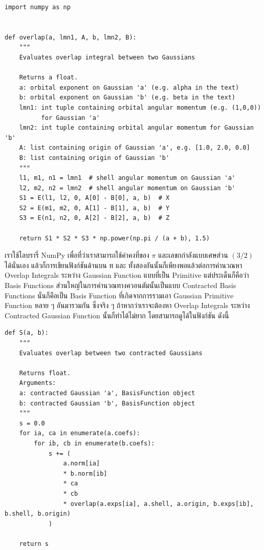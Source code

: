 \vspace{5pt}

\begin{lstlisting}[style=MyPython]
import numpy as np


def overlap(a, lmn1, A, b, lmn2, B):
    """
    Evaluates overlap integral between two Gaussians

    Returns a float.
    a: orbital exponent on Gaussian 'a' (e.g. alpha in the text)
    b: orbital exponent on Gaussian 'b' (e.g. beta in the text)
    lmn1: int tuple containing orbital angular momentum (e.g. (1,0,0))
          for Gaussian 'a'
    lmn2: int tuple containing orbital angular momentum for Gaussian 'b'
    A: list containing origin of Gaussian 'a', e.g. [1.0, 2.0, 0.0]
    B: list containing origin of Gaussian 'b'
    """
    l1, m1, n1 = lmn1  # shell angular momentum on Gaussian 'a'
    l2, m2, n2 = lmn2  # shell angular momentum on Gaussian 'b'
    S1 = E(l1, l2, 0, A[0] - B[0], a, b)  # X
    S2 = E(m1, m2, 0, A[1] - B[1], a, b)  # Y
    S3 = E(n1, n2, 0, A[2] - B[2], a, b)  # Z

    return S1 * S2 * S3 * np.power(np.pi / (a + b), 1.5)
\end{lstlisting}

\vspace{5pt}

เราใช้ไลบรารี่ NumPy เพื่อที่ว่าเราสามารถใช้ค่าคงที่ของ $\pi$ และเลขกกำลังแบบเศษส่วน $(3/2)$ ได้นั่นเอง แล้วก็การเขียนฟังก์ชันด้านบน
ท และ  ทั้งสองอันนั้นก็เพียงพอแล้วต่อการคำนวณหา Overlap Integrals ระหว่าง Gaussian Function
แบบที่เป็น Primitive แต่ประเด็นก็คือว่า Basis Functions ส่วนใหญ่ในการคำนวณทางควอนตัมนั้นเป็นแบบ Contracted Basis Functions
นั่นก็คือเป็น Basis Function ที่เกิดจากการรวมเอา Gaussian Primitive Function หลาย ๆ อันมารวมกัน ซึ่งจริง ๆ ถ้าหากว่าเราจะต้องหา
Overlap Integrals ระหว่าง Contracted Gaussian Function นั้นก็ทำได้ไม่ยาก โดยสามารถดูได้ในฟังก์ชัน  ดังนี้

\vspace{5pt}

\begin{lstlisting}[style=MyPython]
def S(a, b):
    """
    Evaluates overlap between two contracted Gaussians

    Returns float.
    Arguments:
    a: contracted Gaussian 'a', BasisFunction object
    b: contracted Gaussian 'b', BasisFunction object
    """
    s = 0.0
    for ia, ca in enumerate(a.coefs):
        for ib, cb in enumerate(b.coefs):
            s += (
                a.norm[ia]
                * b.norm[ib]
                * ca
                * cb
                * overlap(a.exps[ia], a.shell, a.origin, b.exps[ib], b.shell, b.origin)
            )

    return s
\end{lstlisting}

